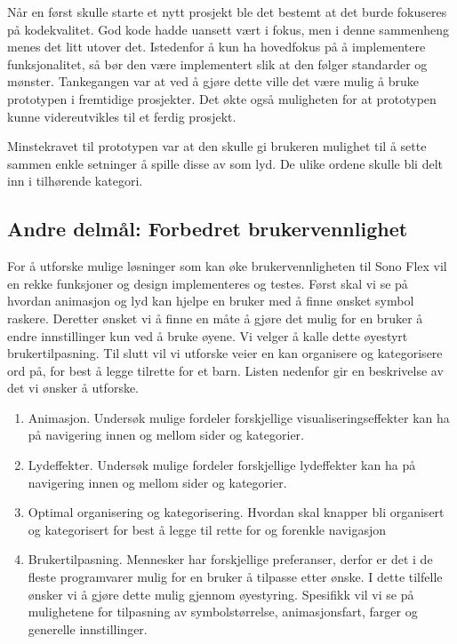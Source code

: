 Når en først skulle starte et nytt prosjekt ble det bestemt at det burde fokuseres på kodekvalitet. God kode hadde uansett vært i fokus, men i denne sammenheng menes det litt utover det. Istedenfor å kun ha hovedfokus på å implementere funksjonalitet, så bør den være implementert slik at den følger standarder og mønster. Tankegangen var at ved å gjøre dette ville det være mulig å bruke prototypen i fremtidige prosjekter. Det økte også muligheten for at prototypen kunne videreutvikles til et ferdig prosjekt. 

Minstekravet til prototypen var at den skulle gi brukeren mulighet til å sette sammen enkle setninger å spille disse av som lyd. De ulike ordene skulle bli delt inn i tilhørende kategori. 


\subsection{Andre delmål: Forbedret brukervennlighet}
\label{sec:ResearchQuestion}

For å utforske mulige løsninger som kan øke brukervennligheten til Sono Flex vil en rekke funksjoner og design implementeres og testes. Først skal vi se på hvordan animasjon og lyd kan hjelpe en bruker med å finne ønsket symbol raskere. Deretter ønsket vi å finne en måte å gjøre det mulig for en bruker å endre innstillinger kun ved å bruke øyene. Vi velger å kalle dette øyestyrt brukertilpasning. Til slutt vil vi utforske veier en kan organisere og kategorisere ord på, for best å legge tilrette for et barn. Listen nedenfor gir en  beskrivelse av det vi ønsker å utforske.

\begin{enumerate} 
\label{lst:features}
\item Animasjon. Undersøk mulige fordeler forskjellige visualiseringseffekter kan ha på navigering innen og mellom sider og kategorier.
\item Lydeffekter. Undersøk mulige fordeler forskjellige lydeffekter kan ha på navigering innen og mellom sider og kategorier.
\item Optimal organisering og kategorisering. Hvordan skal knapper bli organisert og kategorisert for best å legge til rette for og forenkle navigasjon
\item Brukertilpasning. Mennesker har forskjellige preferanser, derfor er det i de fleste programvarer mulig for en bruker å tilpasse etter ønske. I dette tilfelle ønsker vi å gjøre dette mulig gjennom øyestyring. Spesifikk vil vi se på mulighetene for tilpasning av symbolstørrelse, animasjonsfart, farger og generelle innstillinger. 
\end{enumerate}

